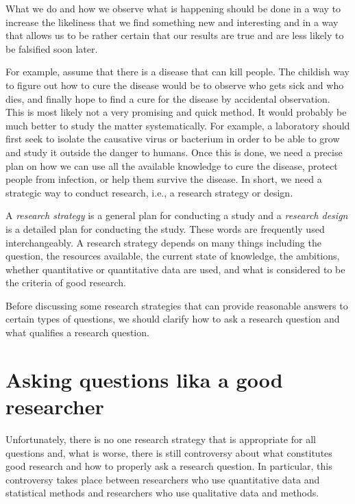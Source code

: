 \documentclass[
  12pt,
  oneside]{book}
\theoremstyle{definition}
\theoremstyle{definition}
\theoremstyle{definition}
\theoremstyle{definition}
\theoremstyle{remark}
\begin{document}
What we do and how we observe what is happening should be done in a way to increase the likeliness that we find something new and interesting and in a way that allows us to be rather certain that our results are true and are less likely to be falsified soon later.

For example, assume that there is a disease that can kill people. The childish way to figure out how to cure the disease would be to observe who gets sick and who dies, and finally hope to find a cure for the disease by accidental observation. This is most likely not a very promising and quick method. It would probably be much better to study the matter systematically. For example, a laboratory should first seek to isolate the causative virus or bacterium in order to be able to grow and study it outside the danger to humans. Once this is done, we need a precise plan on how we can use all the available knowledge to cure the disease, protect people from infection, or help them survive the disease. In short, we need a strategic way to conduct research, i.e., a research strategy or design.

A \emph{research strategy} is a general plan for conducting a study and a \emph{research design} is a detailed plan for conducting the study. These words are frequently used interchangeably.
A research strategy depends on many things including the question, the resources available, the current state of knowledge, the ambitions, whether quantitative or quantitative data are used, and what is considered to be the criteria of good research.

Before discussing some research strategies that can provide reasonable answers to certain types of questions, we should clarify how to ask a research question and what qualifies a research question.

\hypertarget{asking-questions-lika-a-good-researcher}{%
\section{Asking questions lika a good researcher}\label{asking-questions-lika-a-good-researcher}}

Unfortunately, there is no one research strategy that is appropriate for all questions and, what is worse, there is still controversy about what constitutes good research and how to properly ask a research question. In particular, this controversy takes place between researchers who use quantitative data and statistical methods and researchers who use qualitative data and methods.
\end{document}
